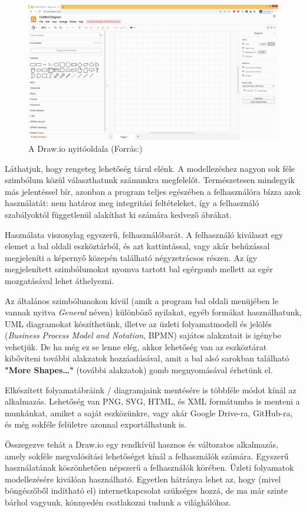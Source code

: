 \begin{figure}[h]
\centering
\includegraphics[scale=0.3]{images/drawio.png}
\caption{A Draw.io nyitóoldala (Forrás:\cite{drawio})}
\label{fig:drawio}
\end{figure}

Láthatjuk, hogy rengeteg lehetőség tárul elénk. A modellezéshez nagyon sok féle szimbólum közül választhatunk számunkra megfelelőt. Természetesen mindegyik más jelentéssel bír, azonban a program teljes egészében a felhasználóra bízza azok használatát: nem határoz meg integritási feltételeket, így a felhasználó szabályoktól függetlenül alakíthat ki számára kedvező ábrákat.

Használata viszonylag egyszerű, felhasználóbarát. A felhasználó kiválaszt egy elemet a bal oldali eszköztárból, és azt kattintással, vagy akár behúzással megjeleníti a képernyő közepén található négyzetrácsos részen. Az így megjelenített szimbólumokat nyomva tartott bal egérgomb mellett az egér mozgatásával lehet áthelyezni.

Az általános szimbólumokon kívül (amik a program bal oldali menüjében le vannak nyitva \textit{General} néven) különböző nyilakat, egyéb formákat használhatunk, UML diagramokat készíthetünk, illetve az üzleti folyamatmodell és jelölés (\textit{Business Process Model and Notation}, BPMN) sajátos alakzatait is igénybe vehetjük. De ha még ez se lenne elég, akkor lehetőség van az eszköztárat kibővíteni további alakzatok hozzáadásával, amit a bal alsó sarokban található \textbf{"More Shapes\ldots"} (további alakzatok) gomb megnyomásával érhetünk el.

Elkészített folyamatábráink / diagramjaink mentésére is többféle módot kínál az alkalmazás. Lehetőség van PNG, SVG, HTML, és XML formátumba is menteni a munkánkat, amiket a saját eszközünkre, vagy akár Google Drive-ra, GitHub-ra, és még sokféle felületre azonnal exportálhatunk is.

Összegezve tehát a Draw.io egy rendkívül hasznos és változatos alkalmazás, amely sokféle megvalósítási lehetőséget kínál a felhasználók számára. Egyszerű használatának köszönhetően népszerű a felhasználók körében. Üzleti folyamatok modellezésére kiválóan használható. Egyetlen hátránya lehet az, hogy (mivel böngészőből indítható el) internetkapcsolat szükséges hozzá, de ma már szinte bárhol vagyunk, könnyedén csatlakozni tudunk a világhálóhoz.

